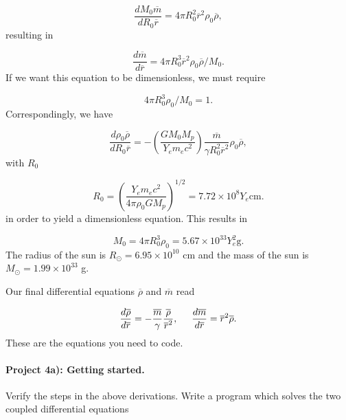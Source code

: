 \documentclass[%
oneside,                 %
final,                   %
10pt]{article}
\begin{document}
\begin{equation*}
\frac{dM_0\overline{m}}{dR_0\overline{r}}=
4\pi R_0^2\overline{r}^{2}\rho_0\overline{\rho},
\end{equation*}
resulting in

\begin{equation*}
\frac{d\overline{m}}{d\overline{r}}=
4\pi R_0^3\overline{r}^{2}\rho_0\overline{\rho}/M_0.
\end{equation*}
If we want this equation to be dimensionless, we must require

\begin{equation*}
4\pi R_{0}^{3}\rho_{0}/M_0=1.
\end{equation*}
Correspondingly, we have

\begin{equation*}
\frac{d\rho_0\overline{\rho}}{dR_0\overline{r}}=
-\left(\frac{GM_0M_p}{Y_em_ec^2 }\right)\frac{\overline{m}}
{\gamma R_0^2\overline{r}^{2}}
\rho_0\overline{\rho},
\end{equation*}
with $R_0$

\begin{equation*}
R_{0}=\left(\frac{Y_{e}m_{e}c^2}{4\pi\rho_{0} GM_{p}}\right)^{1/2}
=7.72\times 10^{8} Y_{e} \mathrm{cm}.
\end{equation*}
in order to yield a dimensionless equation. This results in

\begin{equation*}
M_{0}=4\pi R_{0}^{3}\rho_{0}=5.67 \times 10^{33}Y_{e}^{2} \mathrm{g}.
\end{equation*}
The radius of the sun is $R_{\odot}=6.95\times 10^{10}$ cm 
and the mass of the sun is 
$M_{\odot}=1.99\times 10^{33}$ g.

Our final differential equations 
$\overline{\rho}$ and
$\overline{m}$ read

\begin{equation*}
\frac{d\overline{\rho}}{d\overline{r}}=-\frac{\overline{m}}{\gamma}\frac{\overline{\rho}}
{\overline{r}^{2}},
\hspace{5mm}\frac{d\overline{m}}{d\overline{r}}=
\overline{r}^{2}\overline{\rho}.
\end{equation*}
These are the equations you need to code.


\paragraph{Project 4a): Getting started.}
Verify the steps in the above derivations. Write a program which solves the two coupled
differential equations
\end{document}

